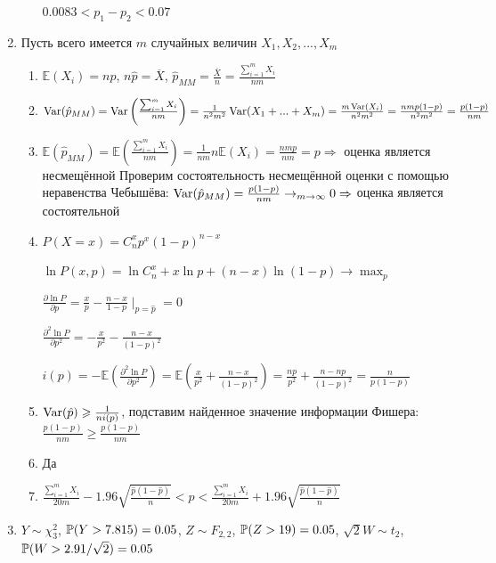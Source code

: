 \documentclass[12pt, a4paper]{article}\usepackage[]{graphicx}\usepackage[]{color}
\begin{document}
\begin{enumerate}
\begin{enumerate}
			$0.0083 < p_1 - p_2 < 0.07$
		\end{enumerate}
		
	\item Пусть всего имеется $m$ случайных величин $X_1, X_2, ... , X_m $
		\begin{enumerate}
			\item $\mathbb{E}(X_i) = np$, $n\hat{p} = \overline{X}$, $\hat{p}_{MM} = \frac{\overline{X}}{n} = \frac{\sum_{i=1}^m X_i}{nm}$
			\item $\Var(\hat{p}_{MM}) = \Var\left(\frac{\sum_{i=1}^m X_i}{nm}\right) = \frac{1}{n^2m^2} \Var(X_1 + ... + X_m) = \frac{m \Var(X_i)}{n^2m^2} = \frac{nmp(1-p)}{n^2m^2} = \frac{p(1-p)}{nm}$
			\item $\mathbb{E}(\hat{p}_{MM}) = \mathbb{E}\left(\frac{\sum_{i=1}^m X_i}{nm}\right) = \frac{1}{nm}n\mathbb{E}(X_i) = \frac{nmp}{nm} = p \Rightarrow$ оценка является несмещённой
			Проверим состоятельность несмещённой оценки с помощью неравенства Чебышёва:
			$\Var(\hat{p}_{MM}) = \frac{p(1-p)}{nm} \to_{m\to\infty} 0 \Rightarrow$ оценка является состоятельной
			\item $P(X=x) = C^x_n p^x (1-p)^{n-x}$
			
			$\ln P(x, p) = \ln C^x_n + x\ln p + (n-x) \ln (1-p) \to \max_p$
			
			$\frac{\partial \ln P}{\partial p} = \frac{x}{p} - \frac{n-x}{1-p} \mid_{p=\hat{p}} = 0$
			
			$\frac{\partial^2 \ln P}{\partial p^2} = -\frac{x}{p^2} - \frac{n-x}{(1-p)^2}$
			
			$i(p) = -\mathbb{E}\left(\frac{\partial^2 \ln P}{\partial p^2}\right) = \mathbb{E}\left(\frac{x}{p^2} + \frac{n-x}{(1-p)^2}\right) = \frac{np}{p^2} + \frac{n-np}{(1-p)^2} = \frac{n}{p(1-p)}$
			
			\item $\Var(\hat{p}) \geq \frac{1}{ni(p)}$, подставим найденное значение информации Фишера: $\frac{p(1-p)}{nm} \geq \frac{p(1-p)}{nm}$
			
			\item Да
			
			\item $\frac{\sum_{i=1}^m X_i}{20m} - 1.96 \sqrt{\frac{\hat{p}(1-\hat{p})}{n}}  < p < \frac{\sum_{i=1}^m X_i}{20m} + 1.96 \sqrt{\frac{\hat{p}(1-\hat{p})}{n}} $
		\end{enumerate}
	
	\item $Y \sim \chi^2_3$, $\P(Y>7.815)=0.05$, $Z \sim F_{2,2}$, $\P(Z>19)=0.05$, $\sqrt{2}W \sim t_{2}$, $\P(W > 2.91/\sqrt{2})=0.05$
	

\end{enumerate}
\end{document}
